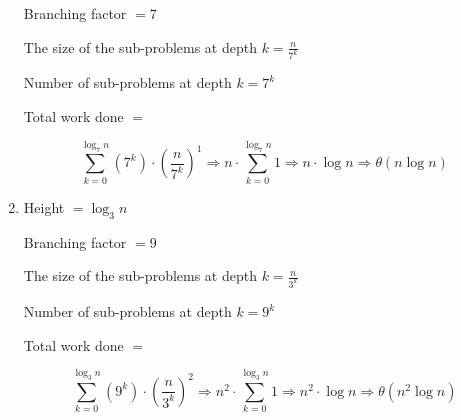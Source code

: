 \documentclass[letterpaper,11pt]{article}
\begin{document}
\begin{enumerate}[label=(\alph*)]
    Branching factor $= 7$

    The size of the sub-problems at depth $k = \frac{n}{7^k}$

    Number of sub-problems at depth $k = 7^k$

    Total work done $=$ 
    
    \[ \sum_{k=0}^{\log_7 n} (7^k) \cdot (\frac{n}{7^k})^1
    \Rightarrow n \cdot \sum_{k=0}^{\log_7 n} 1
    \Rightarrow n \cdot \log n
    \Rightarrow \theta (n \log n) \]
    
    \item Height $= \log_3 n$
    
    Branching factor $= 9$

    The size of the sub-problems at depth $k = \frac{n}{3^k}$

    Number of sub-problems at depth $k = 9^k$

    Total work done $=$ 
    
    \[ \sum_{k=0}^{\log_3 n} (9^k) \cdot (\frac{n}{3^k})^2
    \Rightarrow n^2 \cdot \sum_{k=0}^{\log_3 n} 1
    \Rightarrow n^2 \cdot \log n
    \Rightarrow \theta (n^2 \log n) \]

\end{enumerate}
\end{document}

